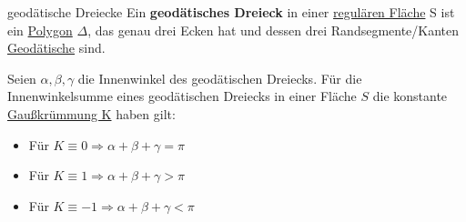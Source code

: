 \begin{titleDef}{geodätische Dreiecke}
\label{geodaetischeDreiecke}
Ein \textbf{geodätisches Dreieck} in einer \hyperref[regFlaeche]{regulären Fläche} S ist ein \hyperref[polygon]{Polygon} $\Delta$, das genau drei Ecken hat und dessen drei Randsegmente/Kanten \hyperref[geodaetische]{Geodätische} sind.\par
Seien $\alpha,\beta,\gamma$ die Innenwinkel des geodätischen Dreiecks. Für die Innenwinkelsumme eines geodätischen Dreiecks in einer Fläche $S$ die konstante \hyperref[gausskruemmung]{Gaußkrümmung K} haben gilt:
\begin{itemize}
	\item Für $K\equiv0\Longrightarrow \alpha+\beta+\gamma=\pi$
	\item Für $K\equiv1\Longrightarrow \alpha+\beta+\gamma>\pi$
	\item Für $K\equiv-1\Longrightarrow \alpha+\beta+\gamma<\pi$
\end{itemize}
\end{titleDef}
